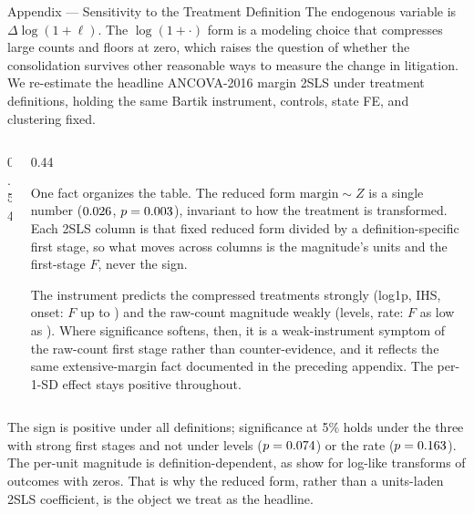
\begin{frame}{Appendix --- Sensitivity to the Treatment Definition}
\hypertarget{app:tdef}{}
\footnotesize
\noindent The endogenous variable is $\Delta\log(1+\ell)$. The $\log(1+\cdot)$ form is a modeling choice that compresses large counts and floors at zero, which raises the question of whether the consolidation survives other reasonable ways to measure the change in litigation. We re-estimate the headline ANCOVA-2016 margin 2SLS under \TdefNdefs{} treatment definitions, holding the same Bartik instrument, controls, state FE, and clustering fixed.
\smallskip
\begin{columns}[T]
\begin{column}{0.54\linewidth}
\centering
\resizebox{\linewidth}{!}{}
\end{column}
\begin{column}{0.44\linewidth}
{\scriptsize
One fact organizes the table. The reduced form $\text{margin}\sim Z$ is a single number ($0.026$, $p=0.003$), invariant to how the treatment is transformed. Each 2SLS column is that fixed reduced form divided by a definition-specific first stage, so what moves across columns is the magnitude's units and the first-stage $F$, never the sign.\par
\smallskip
The instrument predicts the compressed treatments strongly (log1p, IHS, onset: $F$ up to \TdefFhi) and the raw-count magnitude weakly (levels, rate: $F$ as low as \TdefFlo). Where significance softens, then, it is a weak-instrument symptom of the raw-count first stage rather than counter-evidence, and it reflects the same extensive-margin fact documented in the preceding appendix. The per-1-SD effect stays positive throughout.\par}
\end{column}
\end{columns}
\smallskip
{\centering\scriptsize The sign is positive under all \TdefNdefs{} definitions; significance at 5\% holds under the three with strong first stages and not under levels ($p=0.074$) or the rate ($p=0.163$). The per-unit magnitude is definition-dependent, as \citet{chen2024} show for log-like transforms of outcomes with zeros. That is why the reduced form, rather than a units-laden 2SLS coefficient, is the object we treat as the headline.\par}
\smallskip
\centerline{\hyperlink{app:extensive}{}\quad\hyperlink{app:reclass}{}\quad\hyperlink{src:spine1}{}}
\end{frame}
